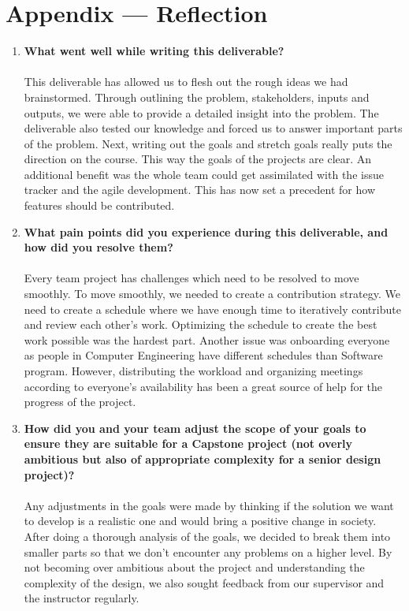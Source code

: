 \documentclass{article}
\begin{document}
\section*{Appendix --- Reflection}


% 

\begin{enumerate}
    \item \textbf{What went well while writing this deliverable?}\\\\
    This deliverable has allowed us to flesh out the rough ideas we had brainstormed. Through outlining the problem, stakeholders, inputs and outputs, we were able to provide a detailed insight into the problem. The deliverable also tested our knowledge and forced us to answer important parts of the problem.
    Next, writing out the goals and stretch goals really puts the direction on the course. This way the goals of the projects are clear.
    An additional benefit was the whole team could get assimilated with the issue tracker and the agile development. This has now set a precedent for how features should be contributed.

    \item \textbf{What pain points did you experience during this deliverable, and how did you resolve them?}\\\\
    Every team project has challenges which need to be resolved to move smoothly. To move smoothly, we needed to create a contribution strategy. We need to create a schedule where we have enough time to iteratively contribute and review each other’s work. Optimizing the schedule to create the best work possible was the hardest part. 
    Another issue was onboarding everyone as people in Computer Engineering have different schedules than Software program. However, distributing the workload and organizing meetings according to everyone’s availability has been a great source of help for the progress of the project.  

    \item \textbf{How did you and your team adjust the scope of your goals to ensure they are suitable for a Capstone project (not overly ambitious but also of appropriate complexity for a senior design project)?}\\\\
    Any adjustments in the goals were made by thinking if the solution we want to develop is a realistic one and would bring a positive change in society. After doing a thorough analysis of the goals, we decided to break them into smaller parts so that we don’t encounter any problems on a higher level. By not becoming over ambitious about the project and understanding the complexity of the design, we also sought feedback from our supervisor and the instructor regularly.
\end{enumerate}  
\end{document}
